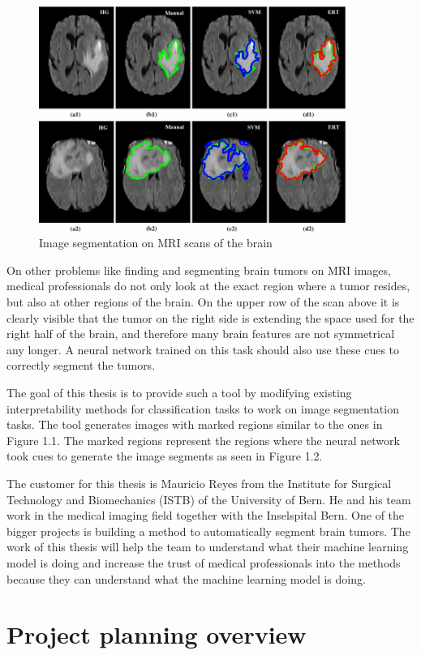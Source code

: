 \begin{figure}[H]
\centering
\caption{Image segmentation on MRI scans of the brain \cite{soltaninejad2017automated}}
\includegraphics[width=10cm]{images/brain_segmentation.jpg}
\end{figure}

On other problems like finding and segmenting brain tumors on MRI images, medical professionals do not only look at the exact region where a tumor resides, but also at other regions of the brain. On the upper row of the scan above it is clearly visible that the tumor on the right side is extending the space used for the right half of the brain, and therefore many brain features are not symmetrical any longer. A neural network trained on this task should also use these cues to correctly segment the tumors. 

The goal of this thesis is to provide such a tool by modifying existing interpretability methods for classification tasks to work on image segmentation tasks. The tool generates images with marked regions similar to the ones in Figure 1.1. The marked regions represent the regions where the neural network took cues to generate the image segments as seen in Figure 1.2.

The customer for this thesis is Mauricio Reyes from the Institute for Surgical Technology and Biomechanics (ISTB) of the University of Bern. He and his team work in the medical imaging field together with the Inselspital Bern. One of the bigger projects is building a method to automatically segment brain tumors. The work of this thesis will help the team to understand what their machine learning model is doing and increase the trust of medical professionals into the methods because they can understand what the machine learning model is doing.

\chapter{Project planning overview}

